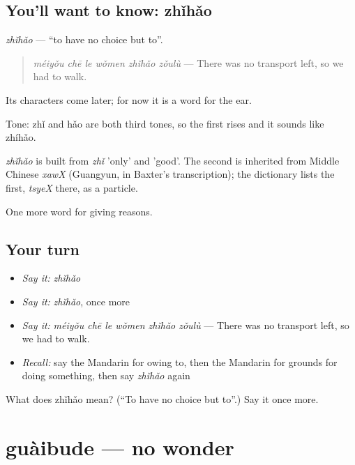 \subsection*{You'll want to know: zhǐhǎo}
\emph{zhǐhǎo} — \textquotedblleft{}to have no choice but to\textquotedblright{}.

\begin{quote}
\emph{méiyǒu chē le wǒmen zhǐhǎo zǒulù} — There was no transport left, so we had to walk.
\end{quote}

Its characters come later; for now it is a word for the ear.

Tone: zhǐ and hǎo are both third tones, so the first rises and it sounds like zhíhǎo.

\begin{cousinweb}
\emph{zhǐhǎo} is built from \emph{zhǐ} 'only' and  'good'. The second is inherited from Middle Chinese \emph{xawX} (Guangyun, in Baxter's transcription); the dictionary lists the first, \emph{tsyeX} there, as a particle.
\end{cousinweb}

\begin{grammarlens}[title={What you've built}]
One more word for giving reasons.
\end{grammarlens}

\subsection*{Your turn}
\begin{itemize}
\raggedright
  \item \emph{Say it:} \emph{zhǐhǎo}
  \item \emph{Say it:} \emph{zhǐhǎo}, once more
  \item \emph{Say it:} \emph{méiyǒu chē le wǒmen zhǐhǎo zǒulù} — There was no transport left, so we had to walk.
  \item \emph{Recall:} say the Mandarin for owing to, then the Mandarin for grounds for doing something, then say \emph{zhǐhǎo} again
\end{itemize}

\begin{tcolorbox}[breakable,colback=teal!4,colframe=teal!35!black,title={Before you move on}]
What does zhǐhǎo mean? (\textquotedblleft{}To have no choice but to\textquotedblright{}.) Say it once more.
\end{tcolorbox}
\section[guàibude]{guàibude — no wonder}

